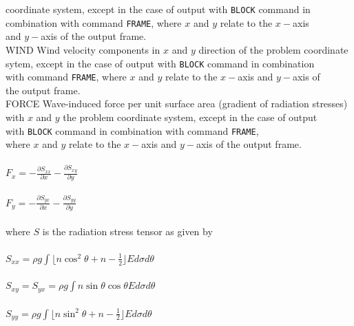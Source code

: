 \documentclass[12pt]{book}
\begin{document}
\begin{tabbing}
                        coordinate system,
                        except in the case of output with {\tt BLOCK} command in\\
                        combination with command {\tt FRAME}, where $x$ and $y$ relate to the $x-$axis\\
                        and $y-$axis of the output frame.\-\\
WIND                 \> Wind velocity components in $x$ and $y$ direction of the problem coordinate\+\\
                        sytem, except in the case of output with {\tt BLOCK} command in
                        combination\\
                        with command {\tt FRAME}, where $x$ and $y$ relate to the $x-$axis and $y-$axis of\\
                        the output frame.\-\\
FORCE                \> Wave-induced force per unit surface area (gradient of radiation stresses)\+\\
                        with $x$ and $y$ the problem coordinate system, except in the case of output\\
                        with {\tt BLOCK} command in
                        combination with command {\tt FRAME},\\
                        where $x$ and $y$ relate to the $x-$axis and $y-$axis of the output frame.\\
                        \\
$F_x = -\frac{\partial S_{xx}}{\partial x} - \frac{\partial S_{xy}}{\partial y}$ \\
                        \\
$F_y = -\frac{\partial S_{yx}}{\partial x} - \frac{\partial S_{yy}}{\partial y}$ \\
                        \\
                        where $S$ is the radiation stress tensor as given by\\
                        \\
$S_{xx} = \rho g \int \lfloor n \cos^2\theta + n - \frac{1}{2} \rfloor E d\sigma d\theta$ \\
                        \\
$S_{xy} = S_{yx} = \rho g \int n \sin\theta \cos\theta E d\sigma d\theta$ \\
                        \\
$S_{yy} = \rho g \int \lfloor n \sin^2\theta + n - \frac{1}{2} \rfloor E d\sigma d\theta$ \\

\end{tabbing}
\end{document}
